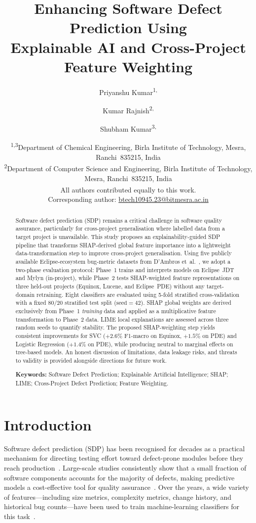 \documentclass[12pt, a4paper]{article}
\title{%
  \vspace{-8mm}
  \LARGE\bfseries
  Enhancing Software Defect Prediction Using\\
  Explainable AI and Cross-Project Feature Weighting%
}
\author{%
  Priyanshu Kumar\textsuperscript{1,\dag} \and
  Kumar Rajnish\textsuperscript{2,\dag} \and
  Shubham Kumar\textsuperscript{3,\dag}
}
\date{%
  \small
  \textsuperscript{1,3}Department of Chemical Engineering,
  Birla Institute of Technology, Mesra, Ranchi~835215, India\\[3pt]
  \textsuperscript{2}Department of Computer Science and Engineering,
  Birla Institute of Technology, Mesra, Ranchi~835215, India\\[5pt]
  \textsuperscript{\dag}All authors contributed equally to this work.\\[3pt]
  Corresponding author:
  \href{mailto:btech10945.23@bitmesra.ac.in}{btech10945.23@bitmesra.ac.in}
}
\begin{document}
\maketitle
\thispagestyle{empty}
\clearpage
\setcounter{page}{1}

\begin{abstract}
Software defect prediction (SDP) remains a critical challenge in software
quality assurance, particularly for cross-project generalisation where
labelled data from a target project is unavailable. This study proposes an
explainability-guided SDP pipeline that transforms SHAP-derived global
feature importance into a lightweight data-transformation step to improve
cross-project generalisation. Using five publicly available Eclipse-ecosystem
bug-metric datasets from D'Ambros et~al.~\cite{dambros2012}, we adopt a
two-phase evaluation protocol: Phase~1 trains and interprets models on
Eclipse~JDT and Mylyn (in-project), while Phase~2 tests SHAP-weighted
feature representations on three held-out projects (Equinox, Lucene, and
Eclipse~PDE) without any target-domain retraining. Eight classifiers are
evaluated using 5-fold stratified cross-validation with a fixed 80/20
stratified test split ($\text{seed}=42$). SHAP global weights are derived
exclusively from Phase~1 \emph{training} data and applied as a multiplicative
feature transformation to Phase~2 data. LIME local explanations are assessed
across three random seeds to quantify stability. The proposed SHAP-weighting
step yields consistent improvements for SVC ($+2.6\%$ F1-macro on Equinox,
$+1.5\%$ on PDE) and Logistic Regression ($+1.4\%$ on PDE), while producing
neutral to marginal effects on tree-based models. An honest discussion of
limitations, data leakage risks, and threats to validity is provided alongside
directions for future work.

\bigskip\noindent
\textbf{Keywords:}
Software Defect Prediction;
Explainable Artificial Intelligence;
SHAP;
LIME;
Cross-Project Defect Prediction;
Feature Weighting.
\end{abstract}

\section{Introduction}
\label{sec:intro}

Software defect prediction (SDP) has been recognised for decades as a
practical mechanism for directing testing effort toward defect-prone modules
before they reach production~\cite{menzies2007}. Large-scale studies
consistently show that a small fraction of software components accounts for
the majority of defects, making predictive models a cost-effective tool for
quality assurance~\cite{ostrand2005,hall2012}. Over the years, a wide variety
of features---including size metrics, complexity metrics, change history, and
historical bug counts---have been used to train machine-learning classifiers
for this task~\cite{li2025,pachouly2022}.
\end{document}

